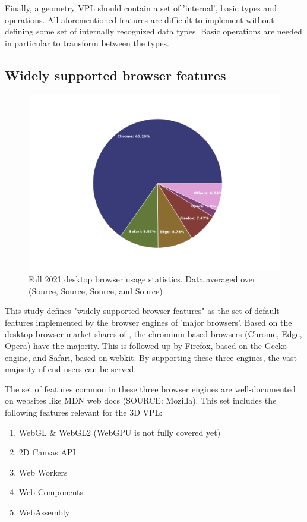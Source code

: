 Finally, a geometry VPL should contain a set of 'internal', basic types and operations.
All aforementioned features are difficult to implement without defining some set of internally recognized data types. 
Basic operations are needed in particular to transform between the types.


\subsection*{Widely supported browser features}

\begin{figure}
  \centering
  \graphicspath{ {../../assets/plots/browser-usage/} }
  \includegraphics[width=0.7\linewidth]{plot.png}
  \caption[Browser usage]{Fall 2021 desktop browser usage statistics. Data averaged over (Source, Source, Source, and Source)}
  \label{fig:browser-usage}
\end{figure}

This study defines "widely supported browser features" as the set of default features implemented by the browser engines of 'major browsers'. 
Based on the desktop browser market shares of , the chromium based browsers (Chrome, Edge, Opera) have the majority. 
This is followed up by Firefox, based on the Gecko engine, and Safari, based on webkit. 
By supporting these three engines, the vast majority of end-users can be served.

The set of features common in these three browser engines are well-documented on websites like MDN web docs (SOURCE: Mozilla). 
This set includes the following features relevant for the 3D VPL:
\begin{enumerate}[-]
  \item WebGL \& WebGL2 (WebGPU is not fully covered yet)
  \item 2D Canvas API
  \item Web Workers
  \item Web Components
  \item WebAssembly
\end{enumerate}


